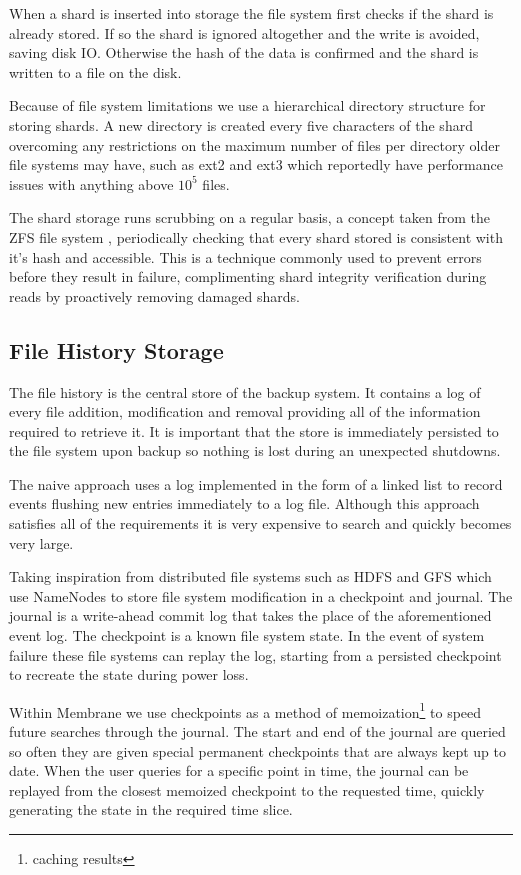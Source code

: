 \documentclass[11pt, a4paper, twoside]{report}
\begin{document}
When a shard is inserted into storage the file system first checks if the shard is already stored. If so the shard is ignored altogether and the write is avoided, saving disk IO. Otherwise the hash of the data is confirmed and the shard is written to a file on the disk.

Because of file system limitations we use a hierarchical directory structure for storing shards. A new directory is created every five characters of the shard overcoming any restrictions on the maximum number of files per directory older file systems may have, such as ext2 and ext3 which reportedly have performance issues with anything above $10^5$ files. \citep{johnson2014files}

The shard storage runs scrubbing on a regular basis, a concept taken from the ZFS file system \citep{oracle2012zfs}, periodically checking that every shard stored is consistent with it's hash and accessible. This is a technique commonly used to prevent errors before they result in failure, complimenting shard integrity verification during reads by proactively removing damaged shards.

\subsection{File History Storage}

The file history is the central store of the backup system. It contains a log of every file addition, modification and removal providing all of the information required to retrieve it. It is important that the store is immediately persisted to the file system upon backup so nothing is lost during an unexpected shutdowns.

The naive approach uses a log implemented in the form of a linked list to record events flushing new entries immediately to a log file. Although this approach satisfies all of the requirements it is very expensive to search and quickly becomes very large.

Taking inspiration from distributed file systems such as HDFS \citep{hdfsAnalysis} and GFS \citep{mckusick2010gfs} which use NameNodes to store file system modification in a checkpoint and journal. The journal is a write-ahead commit log that takes the place of the aforementioned event log. The checkpoint is a known file system state. In the event of system failure these file systems can replay the log, starting from a persisted checkpoint to recreate the state during power loss.

Within Membrane we use checkpoints as a method of memoization\footnote{caching results} to speed future searches through the journal. The start and end of the journal are queried so often they are given special permanent checkpoints that are always kept up to date. When the user queries for a specific point in time, the journal can be replayed from the closest memoized checkpoint to the requested time, quickly generating the state in the required time slice.
\end{document}
